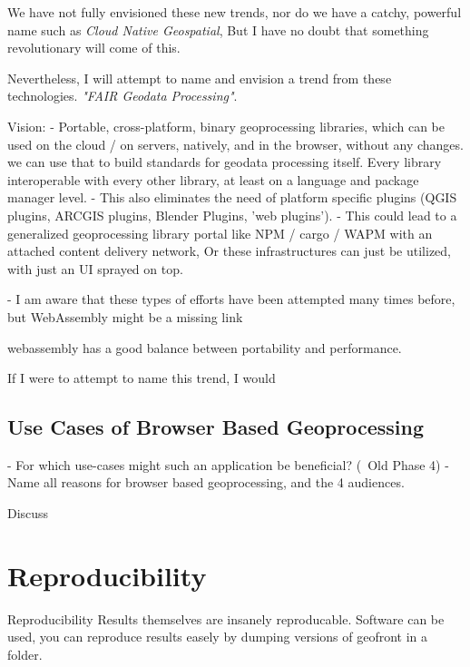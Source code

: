 We have not fully envisioned these new trends, nor do we have a catchy, powerful name such as \emph{Cloud Native Geospatial}, But I have no doubt that something revolutionary will come of this. 

Nevertheless, I will attempt to name and envision a trend from these technologies. \emph{"FAIR Geodata Processing"}.

Vision: 
- Portable, cross-platform, binary geoprocessing libraries, which can be used on the cloud / on servers, natively, and in the browser, without any changes. 
\m{->} we can use that to build standards for geodata processing itself. Every  library interoperable with every other library, at least on a language and package manager level.
- This also eliminates the need of platform specific plugins (QGIS plugins, ARCGIS plugins, Blender Plugins, 'web plugins').
- This could lead to a generalized geoprocessing library portal like NPM / cargo / WAPM with an attached content delivery network, Or these infrastructures can just be utilized, with just an UI sprayed on top.

- I am aware that these types of efforts have been attempted many times before, but WebAssembly might be a missing link 

\m{->} webassembly has a good balance between portability and performance.

\m{->}

If I were to attempt to name this trend, I would









\subsection{Use Cases of Browser Based Geoprocessing}



- For which use-cases might such an application be beneficial? (~Old Phase 4)
- Name all reasons for browser based geoprocessing, and the 4 audiences.

Discuss 

\section{Reproducibility}

Reproducibility
Results themselves are insanely reproducable.
Software can be used, you can reproduce results easely by dumping versions of geofront in 
a folder.

